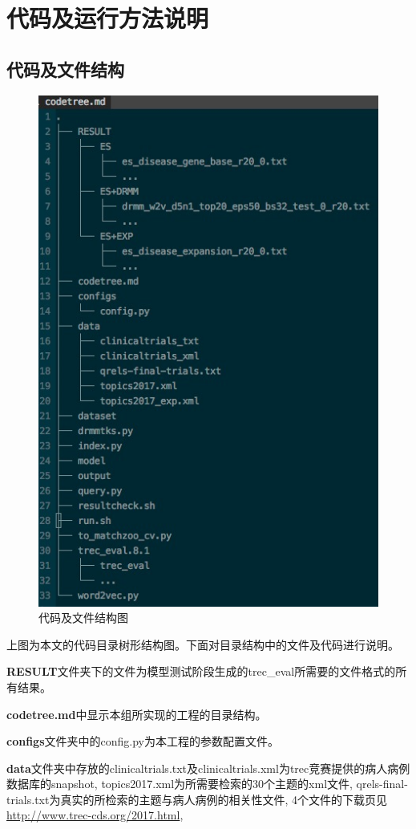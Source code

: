 \documentclass[a4paper]{article}
\begin{document}
\pagebreak
\section{代码及运行方法说明}
\subsection{代码及文件结构}
\begin{figure}[H]
	\centering
	\includegraphics[width=0.7\linewidth]{5}
	\caption{代码及文件结构图}
	\label{fig:5}
\end{figure}
上图为本文的代码目录树形结构图。下面对目录结构中的文件及代码进行说明。
\par
\textbf{RESULT}文件夹下的文件为模型测试阶段生成的trec\_eval所需要的文件格式的所有结果。
\par
\textbf{codetree.md}中显示本组所实现的工程的目录结构。
\par
\textbf{configs}文件夹中的config.py为本工程的参数配置文件。
\par
\textbf{data}文件夹中存放的clinicaltrials.txt及clinicaltrials.xml为trec竞赛提供的病人病例数据库的snapshot,
topics2017.xml为所需要检索的30个主题的xml文件,
qrels-final-trials.txt为真实的所检索的主题与病人病例的相关性文件,
4个文件的下载页见\url{http://www.trec-cds.org/2017.html}, 
\end{document}
